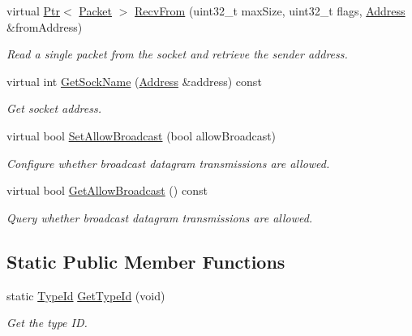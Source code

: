 \begin{DoxyCompactItemize}
virtual \hyperlink{classns3_1_1Ptr}{Ptr}$<$ \hyperlink{classns3_1_1Packet}{Packet} $>$ \hyperlink{classns3_1_1NscTcpSocketImpl_abd8fe759a649166f000f03dfc587b9d2}{Recv\+From} (uint32\+\_\+t max\+Size, uint32\+\_\+t flags, \hyperlink{classns3_1_1Address}{Address} \&from\+Address)
\begin{DoxyCompactList}\small\item\em Read a single packet from the socket and retrieve the sender address. \end{DoxyCompactList}\item 
virtual int \hyperlink{classns3_1_1NscTcpSocketImpl_a83eec133c45dd43daaa867cefadc1e00}{Get\+Sock\+Name} (\hyperlink{classns3_1_1Address}{Address} \&address) const 
\begin{DoxyCompactList}\small\item\em Get socket address. \end{DoxyCompactList}\item 
virtual bool \hyperlink{classns3_1_1NscTcpSocketImpl_aa23e7d469bf8ddda8706b5acb16981c6}{Set\+Allow\+Broadcast} (bool allow\+Broadcast)
\begin{DoxyCompactList}\small\item\em Configure whether broadcast datagram transmissions are allowed. \end{DoxyCompactList}\item 
virtual bool \hyperlink{classns3_1_1NscTcpSocketImpl_a202a821adc81d21eee4daf1411e1e318}{Get\+Allow\+Broadcast} () const 
\begin{DoxyCompactList}\small\item\em Query whether broadcast datagram transmissions are allowed. \end{DoxyCompactList}\end{DoxyCompactItemize}
\subsection*{Static Public Member Functions}
\begin{DoxyCompactItemize}
\item 
static \hyperlink{classns3_1_1TypeId}{Type\+Id} \hyperlink{classns3_1_1NscTcpSocketImpl_a886312a28a0d8ee64dda7d84b5d24a6c}{Get\+Type\+Id} (void)
\begin{DoxyCompactList}\small\item\em Get the type ID. \end{DoxyCompactList}\end{DoxyCompactItemize}
